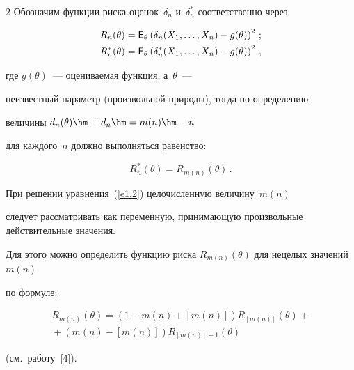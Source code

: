 \begin{multicols}{2}
Обозначим функции риска оценок~$\delta_n$ и~$\delta^*_n$ соответственно через





\noindent


\begin{align*}


R_n(\theta)& = {\sf E}_\theta \left(\delta_n(X_1,\ldots,X_n) 


- g(\theta)\right)^2\,;\\


R^*_n(\theta) & = {\sf E}_\theta \left(\delta^*_n(X_1,\ldots,X_n)


 - g(\theta)\right)^2\,,


\end{align*}


где $g(\theta)$~--- оцениваемая функция, а~$\theta$~--- 


неизвестный параметр (произвольной природы), тогда по определению 


величины $d_n(\theta)\hm \equiv d_n\hm = m(n)\hm - n$ 


для каждого~$n$ должно выполняться равенство:


\begin{equation}


R^*_n(\theta) = R_{m(n)}(\theta)\,. 


\label{e1.2}


\end{equation}


При решении уравнения~(\ref{e1.2}) целочисленную величину~$m(n)$ 


следует рассматривать как переменную, принимающую произвольные действительные значения. 


Для этого можно определить функцию риска $R_{m(n)}(\theta)$ для нецелых значений~$m(n)$ 


по формуле:


\begin{multline*}


R_{m(n)}(\theta) = \left(1 - m(n) + [m(n)]\right) R_{[m(n)]}(\theta) +{}\\


{}+


\left(m(n) - [m(n)]\right) R_{[m(n)]+1}(\theta)


\end{multline*}


(см.\ работу~[4]).






\end{multicols}
